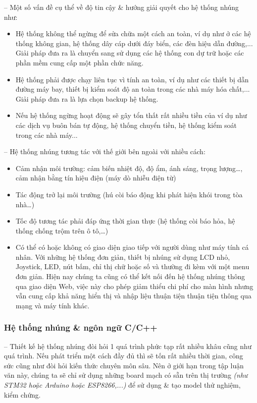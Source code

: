 	-- Một số vấn đề cụ thể về độ tin cậy \& hướng giải quyết cho hệ thống nhúng như:
\begin{itemize}
		\item Hệ thống không thể ngừng để sửa chữa một cách an toàn, ví dụ như ở các hệ thống không gian, hệ thống dây cáp dưới đáy biển, các đèn hiệu dẫn đường,... Giải pháp đưa ra là chuyển sang sử dụng các hệ thống con dự trữ hoặc các phần mềm cung cấp một phần chức năng.
		
		\item Hệ thống phải được chạy liên tục vì tính an toàn, ví dụ như các thiết bị dẫn đường máy bay, thiết bị kiểm soát độ an toàn trong các nhà máy hóa chất,... Giải pháp đưa ra là lựa chọn backup hệ thống.
		
		\item Nếu hệ thống ngừng hoạt động sẽ gây tổn thất rất nhiều tiền của ví dụ như các dịch vụ buôn bán tự động, hệ thống chuyển tiền, hệ thống kiểm soát trong các nhà máy...
\end{itemize}

	-- Hệ thống nhúng tương tác với thế giới bên ngoài với nhiều cách:
\begin{itemize}
	\item Cảm nhận môi trường: cảm biến nhiệt độ, độ ẩm, ánh sáng, trọng lượng…, cảm nhận bằng tín hiệu điện (máy dò nhiễu điện từ)
	
	\item Tác động trở lại môi trường (hú còi báo động khi phát hiện khói trong tòa nhà…)
	
	\item Tốc độ tương tác phải đáp ứng thời gian thực (hệ thống còi báo hỏa, hệ thống chống trộm trên ô tô,…)
	
	\item Có thể có hoặc không có giao diện giao tiếp với người dùng như máy tính cá nhân. Với những hệ thống đơn giản, thiết bị nhúng sử dụng LCD nhỏ, Joystick, LED, nút bấm, chỉ thị chữ hoặc số và thường đi kèm với một menu đơn giản. Hiện nay chúng ta cũng có thể kết nối đến hệ thống nhúng thông qua giao diện Web, việc này cho phép giảm thiểu chi phí cho màn hình nhưng vẫn cung cấp khả năng hiển thị và nhập liệu thuận tiện thuận tiện thông qua mạng và máy tính khác.
\end{itemize}	
	
	\subsubsection{Hệ thống nhúng \& ngôn ngữ C/C++}
	-- Thiết kế hệ thống nhúng đòi hỏi 1 quá trình phức tạp rất nhiều khâu cũng như quá trình. Nếu phát triển một cách đầy đủ thì sẽ tốn rất nhiều thời gian, công sức cũng như đòi hỏi kiến thức chuyên môn sâu. Nên ở giới hạn trong tập luận văn này, chúng ta sẽ chỉ sử dụng những board mạch có sẵn trên thị trường \textit{(như STM32 hoặc Arduino hoặc ESP8266,...)} để sử dụng \& tạo model thử nghiệm, kiểm chứng.
	
